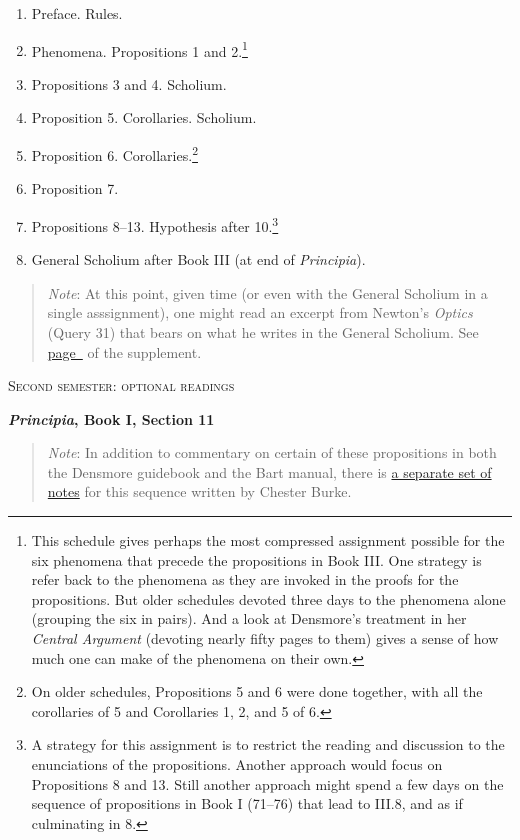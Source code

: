 \documentclass[10pt]{article}
\begin{document}
\begin{enumerate}[resume*] \item Preface. Rules.  \item
		Phenomena. Propositions 1 and
		2.\footnote{This schedule gives perhaps the
			most compressed assignment possible
			for the six phenomena that precede
			the propositions in Book III. One
			strategy is refer back to the
			phenomena as they are invoked in the
			proofs for the propositions. But
			older schedules devoted three days
			to the phenomena alone (grouping the
			six in pairs). And a look at
			Densmore's treatment in her
			\emph{Central Argument} (devoting
			nearly fifty pages to them) gives a
			sense of how much one can make of
			the phenomena on their own.}
	\item Propositions 3 and 4. Scholium.
	\item Proposition 5. Corollaries. Scholium.
	\item Proposition 6. Corollaries.\footnote{On older
			schedules, Propositions 5 and 6 were done
			together, with all the corollaries
			of 5 and Corollaries 1, 2, and 5 of
			6.} 
	\item Proposition 7. 
	\item Propositions 8--13. Hypothesis after
		10.\footnote{A strategy for this assignment
			is to restrict the reading and
			discussion to the enunciations of the
			propositions. Another approach would
		focus on Propositions 8 and 13. Still
		another approach might spend a few days on
		the sequence of propositions in Book I
		(71--76) that lead to III.8, and as if culminating in 8.}
	\item General Scholium after Book III (at end of
		\emph{Principia}).
	\end{enumerate}
	\begin{quote}
		\small{\emph{Note}: At this point, given
			time (or even with the
			General Scholium in a single 
			asssignment), one might read an excerpt from
		Newton's \emph{Optics} (Query 31) that bears
	on what he writes in the General Scholium. See
	\hyperref[supple.79]{page~\pageref{supple.79}} of the
		supplement.}
	\end{quote}	
	\begin{center} \textsc{\small{Second
				semester: optional
				readings}} \end{center}
	\textbf{\emph{Principia}, Book I, Section 11}
	\label{Newton} 
	\begin{quote} \small{\emph{Note}: In
			addition to commentary on certain of
			these propositions in both the
			Densmore guidebook and the Bart
			manual, there is \href{https://drive.google.com/file/d/1c0gRZDPmndb5C2JiWYSOIiMQD-mNR2cD/view?usp=sharing}{a separate set of
			notes} for this sequence written by
			Chester Burke.} \end{quote}
\end{document}
